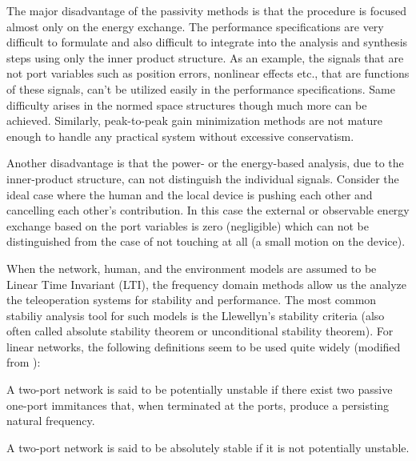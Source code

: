 The major disadvantage of the passivity methods is that the procedure is focused almost only on the 
energy exchange. The performance specifications are very difficult to formulate and also difficult 
to integrate into the analysis and synthesis steps using only the inner product structure. As an 
example, the signals that are not port variables such as position errors, nonlinear effects etc.,
that are functions of these signals, can't be utilized easily in the performance specifications. 
Same difficulty arises in the normed space structures though much more can be achieved. Similarly,
peak-to-peak gain minimization methods are not mature enough to handle any practical system without 
excessive conservatism. 


Another disadvantage is that the power- or the energy-based analysis, due to the inner-product structure, 
can not distinguish the individual signals. Consider the ideal case where the human and the local 
device is pushing each other and cancelling each other's contribution. In this case the external or observable 
energy exchange based on the port variables is zero (negligible) which can not be distinguished from the case of 
not touching at all (a small motion on the device). 


When the network, human, and the environment models are assumed to be Linear Time Invariant (LTI), the frequency domain methods
allow us the analyze the teleoperation systems for stability and performance. The most common stabiliy analysis tool for such 
models is the Llewellyn's stability criteria (also often called absolute stability theorem or unconditional stability theorem). 
For linear networks, the following definitions seem to be used quite widely (modified from \cite{chen91}): 

\begin{define} A two-port network is said to be potentially unstable if there exist two passive one-port 
immitances that, when terminated at the ports, produce a persisting natural frequency.
\end{define}

\begin{define} A two-port network is said to be absolutely stable if it is not potentially unstable.
\end{define}


